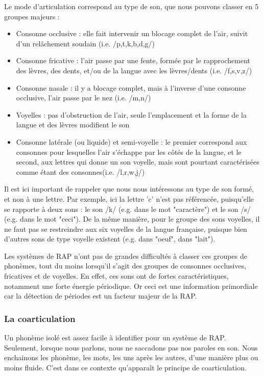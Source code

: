 	Le mode d'articulation correspond au type de son, que nous pouvons classer en 5 groupes majeurs :
	\begin{itemize}
		\item{Consonne occlusive : elle fait intervenir un blocage complet de l'air, suivit d'un relâchement soudain (i.e. /p,t,k,b,d,g/)}
		\item{Consonne fricative : l'air passe par une fente, formée par le rapprochement des lèvres, des dents, et/ou de la langue avec les lèvres/dents (i.e. /f,s,v,z/)}
		\item{Consonne nasale : il y a blocage complet, mais à l'inverse d'une consonne occlusive, l'air passe par le nez (i.e. /m,n/)}
		\item{Voyelles : pas d'obstruction de l'air, seule l'emplacement et la forme de la langue et des lèvres modifient le son}
		\item{Consonne latérale (ou liquide) et semi-voyelle : le premier correspond aux consonnes pour lesquelles l'air s'échappe par les côtés de la langue, et le second, aux lettres qui donne un son voyelle, mais sont pourtant caractérisées comme étant des consonnes(i.e. /l,r,w,j/)}
	\end{itemize}
	Il est ici important de rappeler que nous nous intéressons au type de son formé, et non à une lettre. Par exemple, ici la lettre 'c' n'est pas référencée, puisqu'elle se rapporte à deux sons : le son /k/ (e.g. dans le mot "caractère") et le son /s/ (e.g. dans le mot "ceci"). De la même manière, pour le groupe des sons voyelles, il ne faut pas se restreindre aux six voyelles de la langue française, puisque bien d'autres sons de type voyelle existent (e.g. \textipa{/\oe/} dans "oeuf",  dans "lait").
	
	Les systèmes de RAP n'ont pas de grandes difficultés à classer ces groupes de phonèmes, tout du moins lorsqu'il s'agit des groupes de consonnes occlusives, fricatives et de voyelles. En effet, ces sons ont de fortes caractéristiques, notamment une forte énergie périodique. Or ceci est une information primordiale car la détection de périodes est un facteur majeur de la RAP.
	
	
	
	\subsubsection{La coarticulation}
	Un phonème isolé est assez facile à identifier pour un système de RAP. Seulement, lorsque nous parlons, nous ne saccadons pas nos paroles en son. Nous enchainons les phonème, les mots, les uns après les autres, d'une manière plus ou moins fluide. C'est dans ce contexte qu'apparaît le principe de coarticulation.
	
